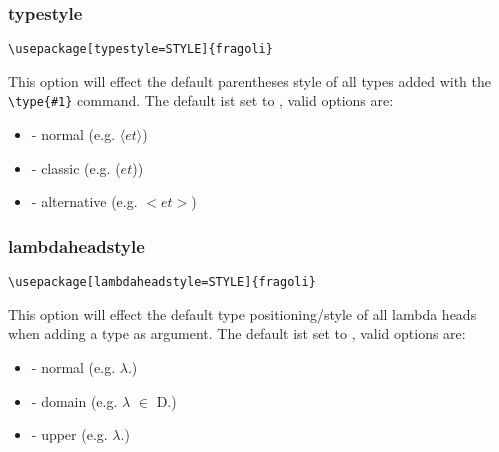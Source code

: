 \documentclass[10pt, a4paper]{article}
\newenvironment{itemizeexample}{
	\begin{itemize}
		\setlength\itemsep{-.5em}
	}
	{
	\end{itemize}
}
\begin{document}
	\subsubsection{typestyle}
	\begin{lstlisting}[style=A]
			\usepackage[typestyle=STYLE]{fragoli}
	\end{lstlisting}
	This option will effect the default parentheses style of all types added with the \verb=\type{#1}= command. The default ist set to \texttt{}, valid options are:
	\begin{itemizeexample}
		\item[-] normal (e.g. $\langle$$et$$\rangle$)
		\item[-] classic (e.g. ($et$))
		\item[-] alternative (e.g. $<$$et$$>$)
	\end{itemizeexample}
	\subsubsection{lambdaheadstyle}
	\begin{lstlisting}[style=A]
			\usepackage[lambdaheadstyle=STYLE]{fragoli}
	\end{lstlisting}
	This option will effect the default type positioning/style of all lambda heads when adding a type as argument. The default ist set to \texttt{}, valid options are:
	\begin{itemizeexample}
		\item[-] normal (e.g. $\lambda$\textsubscript{}\!.)
		\item[-] domain (e.g. $\lambda$ $\in$ D\textsubscript{}\!.)
		\item[-] upper (e.g. $\lambda$\textsuperscript{}\!.)
	\end{itemizeexample}
\end{document}
